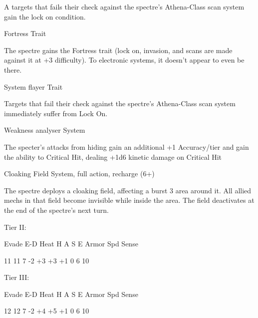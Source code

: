 A targets that fails their check against the spectre's Athena-Class scan system gain the lock on
condition.


Fortress
Trait

The spectre gains the Fortress trait (lock on, invasion, and scans are made against it at +3
difficulty). To electronic systems, it doesn't appear to even be there.


System flayer
Trait

Targets that fail their check against the spectre's Athena-Class scan system immediately suffer
from Lock On.


Weakness analyser
System

The specter's attacks from hiding gain an additional +1 Accuracy/tier and gain the ability to
Critical Hit, dealing +1d6 kinetic damage on Critical Hit


Cloaking Field
System, full action, recharge (6+)

The spectre deploys a cloaking field, affecting a burst 3 area around it. All allied mechs in that
field become invisible while inside the area. The field deactivates at the end of the spectre's next
turn.


Tier II:


          Evade     E-D     Heat    H     A     S     E        Armor        Spd       Sense

          11        11      7       -2    +3    +3    +1       0            6         10

Tier III:


          Evade     E-D     Heat    H     A     S     E        Armor        Spd       Sense

          12        12      7       -2    +4    +5    +1       0            6         10

